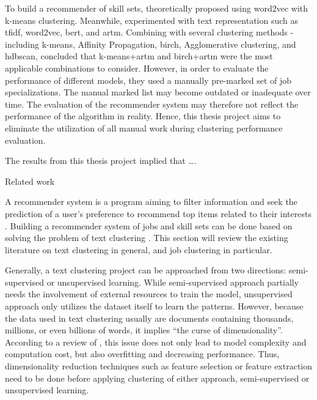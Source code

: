 \documentclass[a4paper,man,floatsintext,natbib,noextraspace]{apa6}
\makeatletter
\renewcommand{\section}{\@startsection {section}{1}
  {\z@}
  {\b@level@one@skip}
  {\e@level@one@skip}
  {\centering\normalfont\bfseries}}
\makeatother
\begin{document}
To build a recommender of skill sets, \cite{mhamdiJobRecommendationBased2020} theoretically proposed using word2vec with k-means clustering. Meanwhile, \cite{vinelExperimentalComparisonUnsupervised2019} experimented with text representation such as \gls{tfidf}, word2vec, \gls{bert}, and \gls{artm}. Combining with several clustering methods - including k-means, Affinity Propagation, \gls{birch}, Agglomerative clustering, and \gls{hdbscan}, \cite{vinelExperimentalComparisonUnsupervised2019} concluded that k-means+\gls{artm} and \gls{birch}+\gls{artm} were the most applicable combinations to consider. However, in order to evaluate the performance of different models, they used a manually pre-marked set of job specializations. The manual marked list may become outdated or inadequate over time. The evaluation of the recommender system may therefore not reflect the performance of the algorithm in reality. Hence, this thesis project aims to eliminate the utilization of all manual work during clustering performance evaluation.

The results from this thesis project implied that ….

\section{Related work}

A recommender system is a program aiming to filter information and seek the prediction of a user’s preference to recommend top items related to their interests \citep{luRecommenderSystemApplication2015}. Building a recommender system of jobs and skill sets can be done based on solving the problem of text clustering \citep{luRecommenderSystemApplication2015}. This section will review the existing literature on text clustering in general, and job clustering in particular.

Generally, a text clustering project can be approached from two directions: semi-supervised or unsupervised learning. While semi-supervised approach partially needs the involvement of external resources to train the model, unsupervised approach only utilizes the dataset itself to learn the patterns. However, because the data used in text clustering usually are documents containing thousands, millions, or even billions of words, it implies “the curse of dimensionality”. According to a review of \cite{alelyaniFeatureSelectionClustering2013}, this issue does not only lead to model complexity and computation cost, but also overfitting and decreasing performance. Thus, dimensionality reduction techniques such as feature selection or feature extraction need to be done before applying clustering of either approach, semi-supervised or unsupervised learning.
\end{document}
